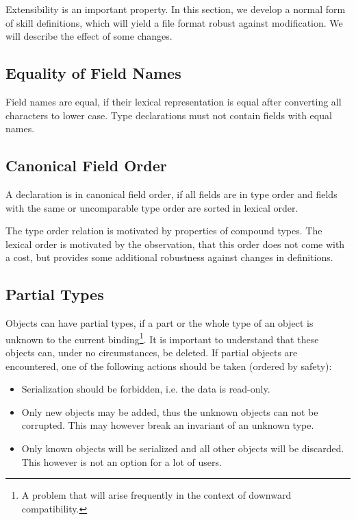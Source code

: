 \documentclass[a4paper,10pt]{article}
\begin{document}
Extensibility is an important property. In this section, we develop a normal form of \gls{skill} definitions, which will yield a file format robust against modification. We will describe the effect of some changes.


\subsection{Equality of Field Names}

Field names are equal, if their lexical representation is equal after converting all characters to lower case. Type declarations must not contain fields with equal names.

\subsection{Canonical Field Order}

A declaration is in canonical field order, if all fields are in type order and fields with the same or uncomparable type order are sorted in lexical order.

The type order relation is motivated by properties of compound types. The lexical order is motivated by the observation, that this order does not come with a cost, but provides some additional robustness against changes in definitions.


\subsection{Partial Types}

Objects can have partial types, if a part or the whole type of an object is unknown to the current binding\footnote{A problem that will arise frequently in the context of downward compatibility.}. It is important to understand that these objects can, under no circumstances, be deleted. If partial objects are encountered, one of the following actions should be taken (ordered by safety):
\begin{itemize}
 \item Serialization should be forbidden, i.e. the data is read-only.
 \item Only new objects may be added, thus the unknown objects can not be corrupted. This may however break an invariant of an unknown type.
 \item Only known objects will be serialized and all other objects will be discarded. This however is not an option for a lot of users.
\end{itemize}
\end{document}
